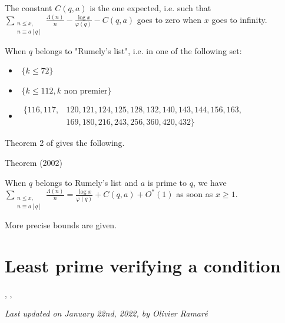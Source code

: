 The constant $C(q,a)$ is the one expected, i.e. such that
$\sum_{\substack{n\le x,\\ n\equiv a[q]}}\frac{\Lambda(n)}{n}
-\frac{\log x}{\varphi(q)}-C(q,a)$ goes to
zero when $x$ goes to infinity.

\par 
  When $q$ belongs to "Rumely's list", i.e. in one of the
following set:
\begin{itemize}
    \item \,\,$\{k\le 72\}$

    \item \,\,$\{k\le 112, \text{$k$ non premier}\}$

    \item \,$\begin{aligned}\{116, 117, &120, 121, 124, 125, 128, 132, 140,
     143, 144, 156, 163, \\ &169, 180, 216, 243, 256, 360, 420, 432\}\end{aligned}$

\end{itemize}
Theorem 2 of
\cite{Ramare*02}
gives the following.
\begin{thm}{Theorem (2002)}

  When $q$ belongs to Rumely's list and $a$ is prime to $q$, we have
  $\displaystyle
  \sum_{\substack{n\le x,\\ n\equiv a[q]}}\frac{\Lambda(n)}{n}
  =\frac{\log x}{\varphi(q)}+C(q,a)+O^*(1)
  $
  as soon as $x\ge1$.
\end{thm}

More precise bounds are given.




\section{Least prime verifying a condition}


\cite{Bach-Sorenson*96},
\cite{Kadiri*05-2},







  
\begin{flushright}\small\sl{}   Last updated on January 22nd, 2022, by Olivier Ramar\'e
 \end{flushright}
















